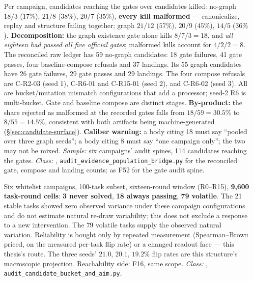 \begin{description}[leftmargin=0pt,labelindent=0pt,labelsep=0pt,style=nextline,font=\normalfont,itemsep=6pt]
\item[\textbf{F53}\quad Gate rejection ledger, five official gates against
      the sixth.]
Per campaign, candidates reaching the gates over candidates killed:
no-graph $18/3$ ($17\%$), $21/8$ ($38\%$), $20/7$ ($35\%$), \textbf{every
kill malformed} --- canonicalize, replay and structure failing together;
graph $21/12$ ($57\%$), $20/9$ ($45\%$), $14/5$ ($36\%$).
\textbf{Decomposition:} the graph existence gate alone kills $8/7/3 = 18$,
and \emph{all eighteen had passed all five official gates}; malformed kills
account for $4/2/2 = 8$. The reconciled raw ledger has 59 no-graph candidates:
18 gate failures, 41 gate passes, four baseline-compose refusals and 37
landings. Its 55 graph candidates have 26 gate failures, 29 gate passes and
29 landings. The four compose refusals are C-R2-03 (seed 1), C-R6-01 and
C-R15-01 (seed 2), and C-R6-02 (seed 3). All are bucket/mutation mismatch
configurations that add a processor; seed-2 R6 is multi-bucket. Gate and
baseline compose are distinct stages.
\textbf{By-product:} the share rejected as malformed at the recorded
gates falls from $18/59 = 30.5\%$ to $8/55 = 14.5\%$, consistent with both artifacts being
machine-generated (\S\ref{sec:candidate-surface}).
\textbf{Caliber warning:} a body citing 18 must say ``pooled over three
graph seeds''; a body citing 8 must say ``one campaign only''; the two may
not be mixed. \emph{Sample:} six campaigns' audit spines, 114 candidates
reaching the gates. \emph{Class:} ,
\texttt{audit\_evidence\_population\_bridge.py} for the reconciled gate,
compose and landing counts; as F52 for the gate audit spine.

\item[\textbf{F54}\quad Task-class census --- historical stability and
      observed natural variation.]
Six whitelist campaigns, 100-task subset, sixteen-round window
(R0--R15), \textbf{9{,}600 task-round cells}: \textbf{3 never solved},
\textbf{18 always passing}, \textbf{79 volatile}. The 21 stable tasks
showed zero observed variance under these campaign configurations and do
not estimate natural re-draw variability; this does not exclude a response
to a new intervention. The 79 volatile tasks supply the observed natural
variation. Reliability is bought only by repeated measurement
(Spearman--Brown priced, on the measured per-task flip rate) or a
changed readout face --- this thesis's route. The three seeds' $21.0$,
$20.1$, $19.2\%$ flip rates are this structure's macroscopic
projection. Reachability side: F16, same scope. \emph{Class:}
, \texttt{audit\_candidate\_bucket\_and\_aim.py}.


\end{description}
